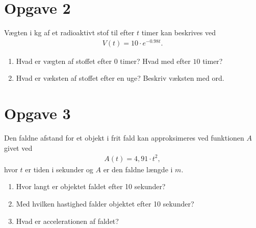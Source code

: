 \section*{Opgave 2}
Vægten i kg af et radioaktivt stof til efter $t$ timer kan beskrives ved
\begin{align*}
V(t) =10\cdot e^{-0.98t}.
\end{align*}
\begin{enumerate}
\item Hvad er vægten af stoffet efter $0$ timer? Hvad med efter $10$ timer?
\item Hvad er væksten af stoffet efter en uge? Beskriv væksten med ord.
\end{enumerate}
\section*{Opgave 3}
Den faldne afstand for et objekt i frit fald kan approksimeres ved funktionen $A$ givet ved
\begin{align*}
A(t) = 4,91 \cdot t^2, 
\end{align*}
hvor $t$ er tiden i sekunder og $A$ er den faldne længde i $m$.
\begin{enumerate}
\item Hvor langt er objektet faldet efter 10 sekunder?
\item Med hvilken hastighed falder objektet efter 10 sekunder?
\item Hvad er accelerationen af faldet?
\end{enumerate}